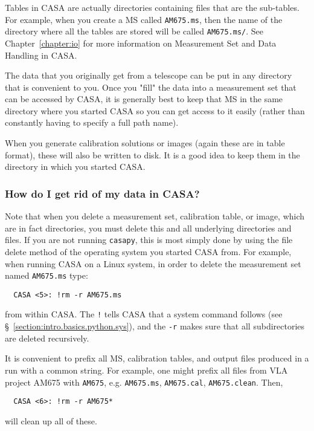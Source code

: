 Tables in CASA are actually directories containing files that are the
sub-tables.  For example, when you create a MS called {\tt AM675.ms},
then the name of the directory where all the tables are stored will be
called {\tt AM675.ms/}.  See Chapter~\ref{chapter:io} for more
information on Measurement Set and Data Handling in CASA.

The data that you originally get from a telescope can be put in any
directory that is convenient to you.  Once you "fill" the data into a
measurement set that can be accessed by CASA, it is generally best to
keep that MS in the same directory where you started CASA so you can
get access to it easily (rather than constantly having to specify a
full path name).

When you generate calibration solutions or images (again these
are in table format), these will also be written to disk.  It is a
good idea to keep them in the directory in which you started CASA.

\subsubsection{How do I get rid of my data in CASA?}
\label{section:intro.common.data.delete}

Note that when you delete a measurement set, calibration table, or 
image, which are in fact directories, you must delete this and all underlying
directories and files.  If you are not running {\tt casapy}, this is
most simply done by using the file delete method of the operating
system you started CASA from.  For example, when running CASA on a
Linux system, in order to delete the measurement set named 
{\tt AM675.ms} type:
\small
\begin{verbatim}
  CASA <5>: !rm -r AM675.ms
\end{verbatim}
\normalsize
from within CASA.  The {\tt !} tells CASA that a system command
follows (see \S~\ref{section:intro.basics.python.sys}),
and the {\tt -r} makes sure that all subdirectories are deleted
recursively. 

It is convenient to prefix all MS, calibration tables,
and output files produced in a run with a common string.  For example,
one might prefix all files from VLA project AM675 with {\tt AM675},
e.g. {\tt AM675.ms}, {\tt AM675.cal}, {\tt AM675.clean}.  Then,
\small
\begin{verbatim}
  CASA <6>: !rm -r AM675*
\end{verbatim}
\normalsize
will clean up all of these.

